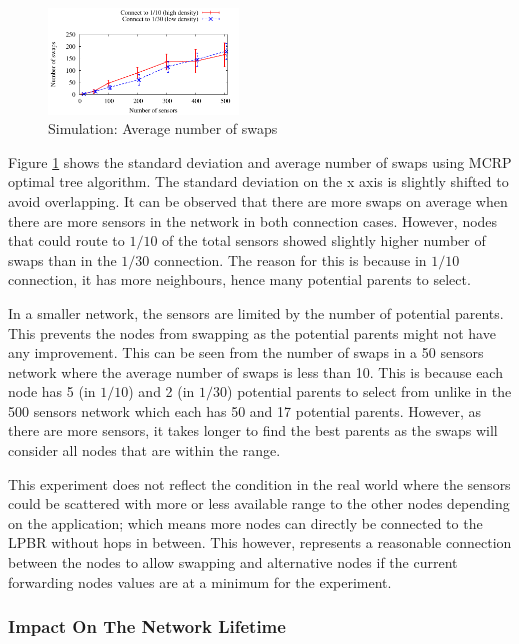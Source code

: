 \begin{figure}
\centering
\includegraphics[width=0.45\textwidth]{figures/swaps.pdf}
\caption{Simulation: Average number of swaps}
\label{fig:aveSwaps}
\end{figure}

Figure \ref{fig:aveSwaps} shows the standard deviation and average number of swaps using MCRP optimal tree algorithm. 
The standard deviation on the x axis is slightly shifted to avoid overlapping.
It can be observed that there are more swaps on average when there are more sensors in the network in both connection cases. However, nodes that could route to $1/10$ of the total sensors showed slightly higher number of swaps than in the $1/30$ connection. The reason for this is because in $1/10$ connection, it has more neighbours, hence many potential parents to select. 

In a smaller network, the sensors are limited by the number of potential parents. This prevents the nodes from swapping as the potential parents might not have any improvement. This can be seen from the number of swaps in a 50 sensors network where the average number of swaps is less than 10. This is because each node has 5 (in $1/10$) and 2 (in $1/30$) potential parents to select from unlike in the 500 sensors network which each has 50 and 17 potential parents. However, as there are more sensors, it takes longer to find the best parents as the swaps will consider all nodes that are within the range.

This experiment does not reflect the condition in the real world where the sensors could be scattered with more or less available range to the other nodes depending on the application; which means more nodes can directly be connected to the LPBR without hops in between. This however, represents a reasonable connection between the nodes to allow swapping and alternative nodes if the current forwarding nodes values are at a minimum for the experiment.

\subsubsection{Impact On The Network Lifetime}

